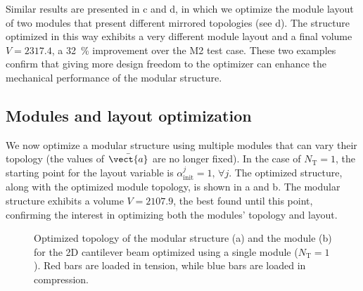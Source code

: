 Similar results are presented in c and d, in which we optimize the module layout of two modules that present different mirrored topologies (see d). The structure optimized in this way exhibits a very different module layout and a final volume $V = 2317.4$, a \qty{32}{\%} improvement over the M2 test case. These two examples confirm that giving more design freedom to the optimizer can enhance the mechanical performance of the modular structure.

\subsection{Modules and layout optimization}
We now optimize a modular structure using multiple modules that can vary their topology (the values of $\bar{\vect{a}}$ are no longer fixed). In the case of $N_\text{T}=1$, the starting point for the layout variable is $\alpha^j_\text{init}=1, \, \forall j$. The optimized structure, along with the optimized module topology, is shown in a and b. The modular structure exhibits a volume $V = 2107.9$, the best found until this point, confirming the interest in optimizing both the modules' topology and layout.

\begin{figure}
    \hspace*{\fill}
    \hfill
    \hspace*{\fill}
    \caption{Optimized topology of the modular structure (a) and the module (b) for the 2D cantilever beam optimized using a single module ($N_\text{T}=1$). Red bars are loaded in tension, while blue bars are loaded in compression.}
    \label{fig:06_module_topol_opt}
\end{figure}

